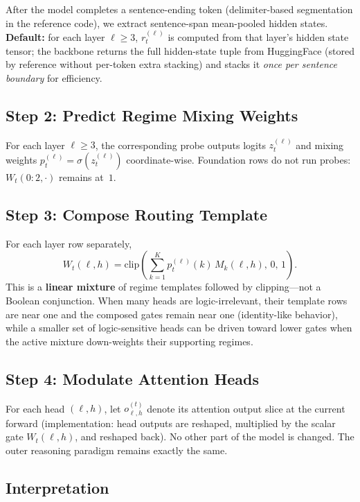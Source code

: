 \documentclass[11pt]{article}
\begin{document}
After the model completes a sentence-ending token (delimiter-based segmentation in the reference code), we extract sentence-span mean-pooled hidden states. \textbf{Default:} for each layer $\ell\ge 3$, $r_t^{(\ell)}$ is computed from that layer's hidden state tensor; the backbone returns the full hidden-state tuple from HuggingFace (stored by reference without per-token extra stacking) and stacks it \emph{once per sentence boundary} for efficiency.

\subsection{Step 2: Predict Regime Mixing Weights}

For each layer $\ell\ge 3$, the corresponding probe outputs logits $z_t^{(\ell)}$ and mixing weights $p_t^{(\ell)}=\sigma(z_t^{(\ell)})$ coordinate-wise. Foundation rows do not run probes: $W_t(0\!:\!2,\cdot)$ remains at~$1$.

\subsection{Step 3: Compose Routing Template}

For each layer row separately,
\[
W_t(\ell,h)=\mathrm{clip}\!\left(\sum_{k=1}^{K} p_t^{(\ell)}(k)\, M_k(\ell,h),\,0,\,1\right).
\]
This is a \textbf{linear mixture} of regime templates followed by clipping---not a Boolean conjunction. When many heads are logic-irrelevant, their template rows are near one and the composed gates remain near one (identity-like behavior), while a smaller set of logic-sensitive heads can be driven toward lower gates when the active mixture down-weights their supporting regimes.

\subsection{Step 4: Modulate Attention Heads}

For each head $(\ell,h)$, let $o_{\ell,h}^{(t)}$ denote its attention output slice at the current forward (implementation: head outputs are reshaped, multiplied by the scalar gate $W_t(\ell,h)$, and reshaped back). No other part of the model is changed. The outer reasoning paradigm remains exactly the same.

\subsection{Interpretation}
\end{document}
